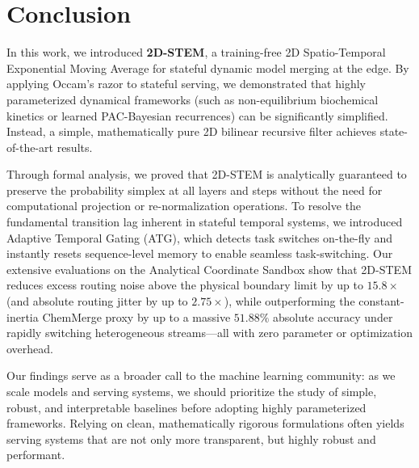 \section{Conclusion}
\label{sec:conclusion}

In this work, we introduced \textbf{2D-STEM}, a training-free 2D Spatio-Temporal Exponential Moving Average for stateful dynamic model merging at the edge. By applying Occam's razor to stateful serving, we demonstrated that highly parameterized dynamical frameworks (such as non-equilibrium biochemical kinetics or learned PAC-Bayesian recurrences) can be significantly simplified. Instead, a simple, mathematically pure 2D bilinear recursive filter achieves state-of-the-art results. 

Through formal analysis, we proved that 2D-STEM is analytically guaranteed to preserve the probability simplex at all layers and steps without the need for computational projection or re-normalization operations. To resolve the fundamental transition lag inherent in stateful temporal systems, we introduced Adaptive Temporal Gating (ATG), which detects task switches on-the-fly and instantly resets sequence-level memory to enable seamless task-switching. Our extensive evaluations on the Analytical Coordinate Sandbox show that 2D-STEM reduces excess routing noise above the physical boundary limit by up to $15.8\times$ (and absolute routing jitter by up to $2.75\times$), while outperforming the constant-inertia ChemMerge proxy by up to a massive $51.88\%$ absolute accuracy under rapidly switching heterogeneous streams—all with zero parameter or optimization overhead.

Our findings serve as a broader call to the machine learning community: as we scale models and serving systems, we should prioritize the study of simple, robust, and interpretable baselines before adopting highly parameterized frameworks. Relying on clean, mathematically rigorous formulations often yields serving systems that are not only more transparent, but highly robust and performant. 

